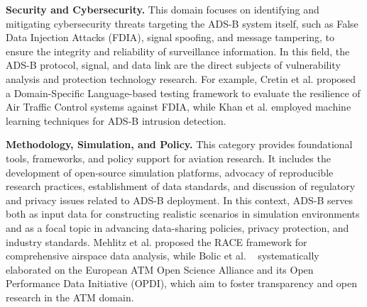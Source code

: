\textbf{Security and Cybersecurity.}
This domain focuses on identifying and mitigating cybersecurity threats targeting the ADS-B system itself, such as False Data Injection Attacks (FDIA), signal spoofing, and message tampering, to ensure the integrity and reliability of surveillance information. In this field, the ADS-B protocol, signal, and data link are the direct subjects of vulnerability analysis and protection technology research. For example, Cretin et al.\cite{cretin2018increasing} proposed a Domain-Specific Language-based testing framework to evaluate the resilience of Air Traffic Control systems against FDIA, while Khan et al. \cite{khan2021intrusion} employed machine learning techniques for ADS-B intrusion detection.

\textbf{Methodology, Simulation, and Policy.}
This category provides foundational tools, frameworks, and policy support for aviation research. It includes the development of open-source simulation platforms, advocacy of reproducible research practices, establishment of data standards, and discussion of regulatory and privacy issues related to ADS-B deployment. In this context, ADS-B serves both as input data for constructing realistic scenarios in simulation environments and as a focal topic in advancing data-sharing policies, privacy protection, and industry standards. Mehlitz et al. \cite{mehlitz2019analyzing} proposed the RACE framework for comprehensive airspace data analysis, while Bolic et al. ~\cite{bolic2024roadmap} systematically elaborated on the European ATM Open Science Alliance and its Open Performance Data Initiative (OPDI), which aim to foster transparency and open research in the ATM domain.


